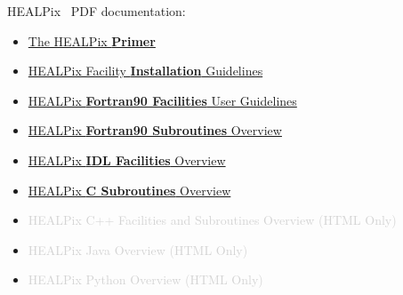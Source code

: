 \documentclass[12pt,twoside]{article}
\begin{document}
\thispagestyle{empty}



{\Large HEALPix \hpxversion\ PDF documentation:}
\begin{itemize}
    \item \href{intro.pdf}{The HEALPix \textbf{Primer}}
    \item \href{install.pdf}{HEALPix Facility \textbf{Installation} Guidelines}
    \item \href{facilities.pdf}{HEALPix \textbf{Fortran90 Facilities} User Guidelines}
    \item \href{subroutines.pdf}{HEALPix \textbf{Fortran90 Subroutines} Overview}
    \item \href{idl.pdf}{HEALPix \textbf{IDL Facilities} Overview}
    \item \href{csub.pdf}{HEALPix \textbf{C Subroutines} Overview}
    \item \textcolor{lightgray} {HEALPix C++ Facilities and Subroutines Overview (HTML Only)}
    \item \textcolor{lightgray} {HEALPix Java Overview (HTML Only)}
    \item \textcolor{lightgray} {HEALPix Python Overview (HTML Only)}
\end{itemize}
\end{document}
